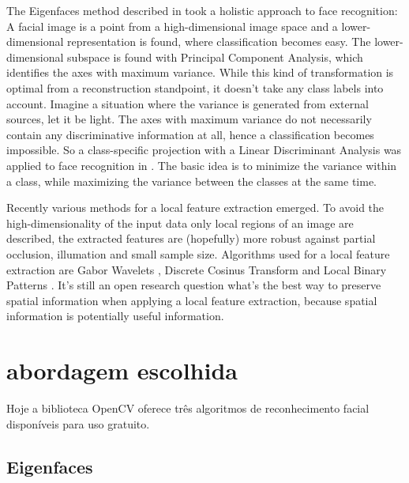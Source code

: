 The Eigenfaces method described in \cite{eigenfaces} took a holistic approach to face recognition: A facial image is a point from a high-dimensional image space and a lower-dimensional representation is found, where classification becomes easy. The lower-dimensional subspace is found with Principal Component Analysis, which identifies the axes with maximum variance. While this kind of transformation is optimal from a reconstruction standpoint, it doesn’t take any class labels into account. Imagine a situation where the variance is generated from external sources, let it be light. The axes with maximum variance do not necessarily contain any discriminative information at all, hence a classification becomes impossible. So a class-specific projection with a Linear Discriminant Analysis was applied to face recognition in \cite{fisherfaces}. The basic idea is to minimize the variance within a class, while maximizing the variance between the classes at the same time.

Recently various methods for a local feature extraction emerged. To avoid the high-dimensionality of the input data only local regions of an image are described, the extracted features are (hopefully) more robust against partial occlusion, illumation and small sample size. Algorithms used for a local feature extraction are Gabor Wavelets \cite{wiskott1997face}, Discrete Cosinus Transform \cite{messer2006performance} and Local Binary Patterns \cite{binaryface}. It’s still an open research question what’s the best way to preserve spatial information when applying a local feature extraction, because spatial information is potentially useful information.

\section*{abordagem escolhida}

Hoje a biblioteca OpenCV oferece três algoritmos de reconhecimento facial disponíveis para uso gratuito. 
\subsection*{Eigenfaces} %
\label{sub:eigenfaces}


